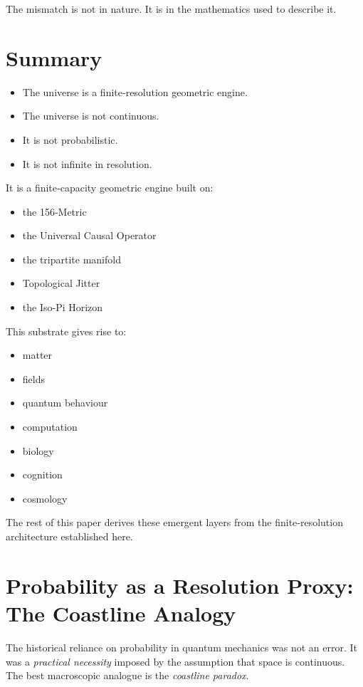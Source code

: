 \documentclass[reprint,amsmath,amssymb,aps,prl,floatfix]{revtex4-2}
\begin{document}
\begin{itemize}
The mismatch is not in nature.  
It is in the mathematics used to describe it.

\section{Summary}
\begin{itemize}
\item The universe is a finite‑resolution geometric engine.
\item The universe is not continuous.  
\item It is not probabilistic.  
\item It is not infinite in resolution.
\end{itemize}
\medskip

It is a finite‑capacity geometric engine built on:
\begin{itemize}
\item the 156‑Metric  
\item the Universal Causal Operator  
\item the tripartite manifold  
\item Topological Jitter  
\item the Iso‑Pi Horizon  
\end{itemize}
\medskip

This substrate gives rise to:
\begin{itemize}
\item matter  
\item fields  
\item quantum behaviour  
\item computation  
\item biology  
\item cognition  
\item cosmology  
\end{itemize}

The rest of this paper derives these emergent layers from the finite‑resolution architecture established here.

\section{Probability as a Resolution Proxy: The Coastline Analogy}

The historical reliance on probability in quantum mechanics was not an error. It was a \textit{practical necessity} imposed by the assumption that space is continuous. The best macroscopic analogue is the \textit{coastline paradox}.
\medskip


\end{itemize}
\end{document}
